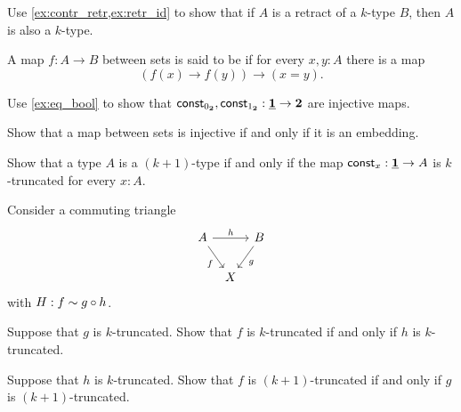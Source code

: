 \begin{exercises}
\item Use \autoref{ex:contr_retr,ex:retr_id} to show that if $A$ is a retract of a $k$-type $B$, then $A$ is also a $k$-type.
\item \label{ex:injective}A map $f:A\to B$ between sets is said to be  if for every $x,y:A$ there is a map
\begin{equation*}
(f(x)\to f(y))\to (x=y).
\end{equation*}
\begin{subexenum}
\item Use \cref{ex:eq_bool} to show that $\mathsf{const}_{0_{\mathbf{2}}},\mathsf{const}_{1_{\mathbf{2}}}:\underline{\mathbf{1}}\to \mathbf{2}$ are injective maps.
\item Show that a map between sets is injective if and only if it is an embedding.
\end{subexenum}
\item Show that a type $A$ is a $(k+1)$-type if and only if the map $\mathsf{const}_x:\underline{\mathbf{1}}\to A$ is $k$-truncated for every $x:A$.
\item Consider a commuting triangle
\begin{equation*}
\begin{tikzcd}[column sep=tiny]
A \arrow[rr,"h"] \arrow[dr,swap,"f"] & & B \arrow[dl,"g"] \\
& X
\end{tikzcd}
\end{equation*}
with $H: f \sim g \circ h$. 
\begin{subexenum}
\item Suppose that $g$ is $k$-truncated. Show that $f$ is $k$-truncated if and only if $h$ is $k$-truncated.
\item Suppose that $h$ is $k$-truncated. Show that $f$ is $(k+1)$-truncated if and only if $g$ is $(k+1)$-truncated.
\end{subexenum}
\end{exercises}
